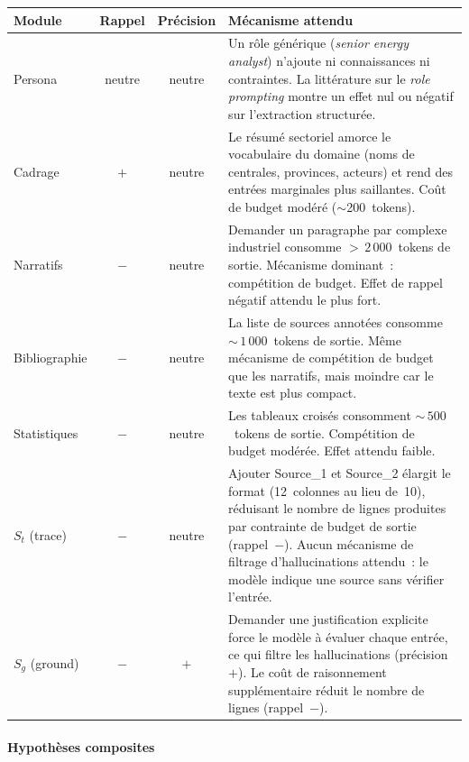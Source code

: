 \begin{center}
\small
\begin{tabular}{l c c p{}}
\toprule
\textbf{Module} & \textbf{Rappel} & \textbf{Précision} & \textbf{Mécanisme attendu} \\
\midrule
Persona       & neutre  & neutre
  & Un rôle générique (\emph{senior energy analyst}) n'ajoute ni
    connaissances ni contraintes. La littérature sur le \emph{role
    prompting} montre un effet nul ou négatif sur l'extraction
    structurée. \\
\addlinespace
Cadrage       & $+$     & neutre
  & Le résumé sectoriel amorce le vocabulaire du domaine (noms de
    centrales, provinces, acteurs) et rend des entrées marginales
    plus saillantes. Coût de budget modéré ($\sim$200~tokens). \\
\addlinespace
Narratifs     & $-$     & neutre
  & Demander un paragraphe par complexe industriel consomme
    ${>}\,2\,000$~tokens de sortie. Mécanisme dominant~: compétition
    de budget. Effet de rappel négatif attendu le plus fort. \\
\addlinespace
Bibliographie & $-$     & neutre
  & La liste de sources annotées consomme ${\sim}\,1\,000$~tokens de
    sortie. Même mécanisme de compétition de budget que les
    narratifs, mais moindre car le texte est plus compact. \\
\addlinespace
Statistiques  & $-$     & neutre
  & Les tableaux croisés consomment ${\sim}\,500$~tokens de sortie.
    Compétition de budget modérée. Effet attendu faible. \\
\addlinespace
$S_t$ (trace) & $-$     & neutre
  & Ajouter Source\_1 et Source\_2 élargit le format (12~colonnes au lieu
    de~10), réduisant le nombre de lignes produites par contrainte de budget
    de sortie (rappel~$-$). Aucun mécanisme de filtrage d'hallucinations
    attendu~: le modèle indique une source sans vérifier l'entrée. \\
\addlinespace
$S_g$ (ground)& $-$     & $+$
  & Demander une justification explicite force le modèle à évaluer chaque
    entrée, ce qui filtre les hallucinations (précision~$+$). Le coût de
    raisonnement supplémentaire réduit le nombre de lignes (rappel~$-$). \\
\bottomrule
\end{tabular}
\end{center}

\paragraph{Hypothèses composites}

